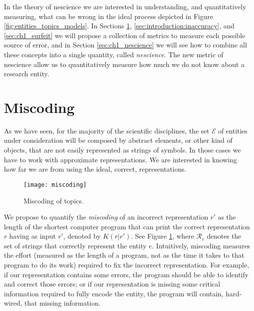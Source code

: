 In the theory of nescience we are interested in understanding, and quantitatively measuring, what can be wrong in the ideal process depicted in Figure \ref{fig:entities_topics_models}. In Sections \ref{sec:ch1_miscoding}, \ref{sec:introduction:inaccuracy}, and \ref{sec:ch1_surfeit} we will propose a collection of metrics to measure each possible source of error, and in Section \ref{sec:ch1_nescience} we will see how to combine all these concepts into a single quantity, called \emph{nescience}. The new metric of nescience allow us to quantitatively measure how much we do not know about a research entity.

%
%

\section{Miscoding}
\label{sec:ch1_miscoding}

As we have seen, for the majority of the scientific disciplines, the set $\mathcal{E}$ of entities under consideration will be composed by abstract elements, or other kind of objects, that are not easily represented as strings of symbols. In those cases we have to work with approximate representations. We are interested in knowing how far we are from using the ideal, correct, representations.

\begin{figure}[h]
\centering\texttt{[image: miscoding]}
\caption{\label{fig:miscoding}Miscoding of topics.}
\end{figure}

We propose to quantify the \emph{miscoding} of an incorrect representation $r'$ as the length of the shortest computer program that can print the correct representation $r$ having as input $r'$, denoted by $K(r|r')$. See Figure \ref{fig:miscoding}, where $\mathcal{R}_e$ denotes the set of strings that correctly represent the entity $e$. Intuitively, miscoding measures the effort (measured as the length of a program, not as the time it takes to that program to do its work) required to fix the incorrect representation. For example, if our representation contains some errors, the program should be able to identify and correct those errors; or if our representation is missing some critical information required to fully encode the entity, the program will contain, hard-wired, that missing information.

